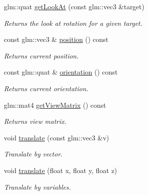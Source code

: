 \begin{DoxyCompactItemize}
glm\+::quat \mbox{\hyperlink{class_camera_a963fa4d081fe59425d6b939c4aa9853d}{get\+Look\+At}} (const glm\+::vec3 \&target)
\begin{DoxyCompactList}\small\item\em Returns the look at rotation for a given target. \end{DoxyCompactList}\item 
\mbox{\label{class_camera_a26f5c28317ec7add2a21ddbdc8e463fb}} 
const glm\+::vec3 \& \mbox{\hyperlink{class_camera_a26f5c28317ec7add2a21ddbdc8e463fb}{position}} () const
\begin{DoxyCompactList}\small\item\em Returns current position. \end{DoxyCompactList}\item 
\mbox{\label{class_camera_a872dd113215278493380d19716c63644}} 
const glm\+::quat \& \mbox{\hyperlink{class_camera_a872dd113215278493380d19716c63644}{orientation}} () const
\begin{DoxyCompactList}\small\item\em Returns current orientation. \end{DoxyCompactList}\item 
\mbox{\label{class_camera_a2f90e661a78172675ca06ea69667b531}} 
glm\+::mat4 \mbox{\hyperlink{class_camera_a2f90e661a78172675ca06ea69667b531}{get\+View\+Matrix}} () const
\begin{DoxyCompactList}\small\item\em Returns view matrix. \end{DoxyCompactList}\item 
\mbox{\label{class_camera_aa00429d00bae4984467f9c5d1a3bd158}} 
void \mbox{\hyperlink{class_camera_aa00429d00bae4984467f9c5d1a3bd158}{translate}} (const glm\+::vec3 \&v)
\begin{DoxyCompactList}\small\item\em Translate by vector. \end{DoxyCompactList}\item 
\mbox{\label{class_camera_ac9e53556c53beee69c77a97e2a1c1068}} 
void \mbox{\hyperlink{class_camera_ac9e53556c53beee69c77a97e2a1c1068}{translate}} (float x, float y, float z)
\begin{DoxyCompactList}\small\item\em Translate by variables. \end{DoxyCompactList}\item 

\end{DoxyCompactItemize}
